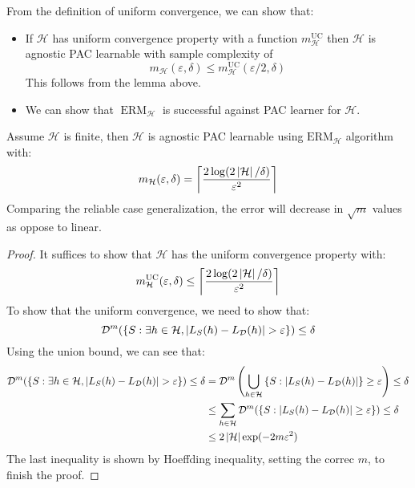 \begin{corollary}
    From the definition of uniform convergence, we can show that:
    \begin{itemize}
        \item If $\mathcal{H}$ has uniform convergence property with a function $m^\text{UC}_\mathcal{H}$ then $\mathcal{H}$ is agnostic PAC learnable with sample complexity of
        \begin{equation*}
            m_\mathcal{H}(\varepsilon,\delta) \le m^\text{UC}_\mathcal{H}(\varepsilon/2,\delta)
        \end{equation*}
        This follows from the lemma above.
        \item We can show that $\operatorname{ERM}_\mathcal{H}$ is successful against PAC learner for $\mathcal{H}$.
    \end{itemize}
\end{corollary}

\begin{theorem}
    Assume $\mathcal{H}$ is finite, then $\mathcal{H}$ is agnostic PAC learnable using $\text{ERM}_\mathcal{H}$ algorithm with:
    \begin{equation*}
        m_\mathcal{H}(\varepsilon,\delta) = \left\lceil \frac{2\log(2\left| \mathcal{H} \right|/\delta)}{\varepsilon^2} \right\rceil
    \end{equation*}
    Comparing the reliable case generalization, the error will decrease in $\sqrt{m}$ values as oppose to linear.
\end{theorem}

\begin{proof}
    It suffices to show that $\mathcal{H}$ has the uniform convergence property with:
    \begin{equation*}
        m^\text{UC}_\mathcal{H}(\varepsilon, \delta) \le \left\lceil \frac{2\log(2\left| \mathcal{H} \right|/\delta)}{\varepsilon^2} \right\rceil
    \end{equation*}
    To show that the uniform convergence, we need to show that:
    \begin{equation*}
        \mathcal{D}^m(\left\{ S : \exists h \in \mathcal{H}, \left| L_S(h) - L_\mathcal{D}(h) \right| > \varepsilon \right\})\le\delta
    \end{equation*}
    Using the union bound, we can see that:
    \begin{equation*}
    \begin{aligned}
        \mathcal{D}^m(\left\{ S : \exists h \in \mathcal{H}, \left| L_S(h) - L_\mathcal{D}(h) \right| > \varepsilon \right\})\le\delta &= \mathcal{D}^m\left( \bigcup_{h\in\mathcal{H}} \left\{ S : |L_S(h) - L_\mathcal{D}(h)| \right\}\ge\varepsilon  \right)\le\delta \\
        &\le \sum_{h\in\mathcal{H}}\mathcal{D}^m(\left\{ S : |L_S(h) - L_\mathcal{D}(h)|\ge\varepsilon  \right\})\le\delta \\
        &\le 2\left| \mathcal{H} \right|\exp(-2m\varepsilon^2)
    \end{aligned}
    \end{equation*}
    The last inequality is shown by Hoeffding inequality, setting the correc $m$, to finish the proof.
\end{proof}

